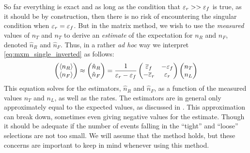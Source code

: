 So far everything is exact and as long as the condition
that $\varepsilon_r>>\varepsilon_f$ is true,
as it should be by construction, 
then there is no risk of encountering the singular condition
when $\varepsilon_r=\varepsilon_f$.
But in the matrix method, 
we wish to use the \emph{measured} values of $n_T$
and $n_T$ to derive an \emph{estimate} of the expectation
for $n_R$ and $n_F$, denoted $\hat{n}_R$ and $\hat{n}_F$. 
Thus, in a rather \emph{ad hoc} way 
we interpret \eqn\eqref{eq:mxm_single_inverted} as follows:
\begin{equation}
  \label{eq:mxm_single_inverted_approx}
  \begin{pmatrix} \langle n_R\rangle \\ \langle n_F\rangle \end{pmatrix} 
  \approx
  \begin{pmatrix} \hat{n}_R \\ \hat{n}_F \end{pmatrix} 
  =
  \frac{1}{\varepsilon_r-\varepsilon_f}
  \begin{pmatrix}
  \overline{\varepsilon}_f & -\varepsilon_f \\ -\overline{\varepsilon}_r & \varepsilon_r
  \end{pmatrix} 
  \begin{pmatrix} n_T \\ n_L \end{pmatrix}
\end{equation}
This equation solves for the estimators, $\hat{n}_R$ and $\hat{n}_F$,
as a function of the measured values $n_T$ and $n_L$, as well 
as the rates. The estimators are in general only approximately equal
to the expected values, as discussed in \cite{Gillam:2014xua}.
This approximation can break down, sometimes even giving negative values
for the estimate.  Though it should be adequate if the number
of events falling in the ``tight'' and ``loose'' selections are 
not too small.
We will assume that the method holds, but these concerns are important
to keep in mind whenever using this method.


